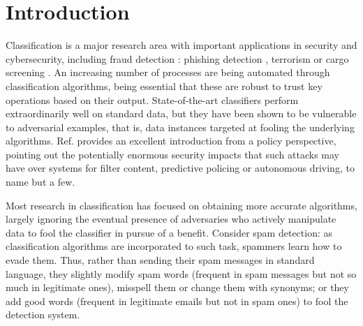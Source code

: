 
\section{Introduction}



Classification is a major research area with important applications  in security and cybersecurity, including fraud detection \cite{bolton2002statistical}: phishing detection \cite{rakesh}, terrorism \cite{terror} or cargo screening \cite{cargo}. An increasing number of processes are being automated through classification algorithms, being essential that these are robust to trust key operations based on their output. State-of-the-art classifiers perform extraordinarily well on standard data, but they have been shown to be vulnerable to adversarial examples, that is, data instances targeted at fooling the underlying algorithms. Ref. \cite{comiter} provides an excellent introduction from a policy perspective, pointing out the potentially enormous security impacts that such attacks may have over systems for filter content, predictive policing or autonomous driving, to name but a few. 

Most research in classification has focused on obtaining more accurate algorithms, largely ignoring the eventual presence of adversaries who actively manipulate data to fool the classifier in pursue of a benefit. Consider 
spam detection: as classification algorithms are incorporated to such task,
spammers learn how to evade them. Thus, rather than sending their spam messages in standard language, they 
 slightly modify spam words (frequent in spam messages but not 
so much in legitimate ones), misspell them or 
change them with synonyms; or they add good words (frequent in legitimate emails but not in spam ones) to fool the detection system. %

